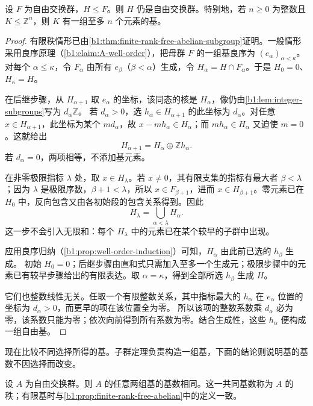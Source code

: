 \begin{theorem}[自由交换群的子群]\label{b1:thm:free-abelian-subgroup}
	设 \(F\) 为自由交换群，\(H\leq F\)。则 \(H\) 仍是自由交换群。特别地，若 \(n\geq0\) 为整数且 \(K\leq\mathbb Z^n\)，则 \(K\) 有一组至多 \(n\) 个元素的基。
\end{theorem}

\begin{proof}
	有限秩情形已由\cref{b1:thm:finite-rank-free-abelian-subgroup}证明。一般情形采用良序原理（\cref{b1:claim:A-well-order}），把母群 \(F\) 的一组基良序为 \((e_\alpha)_{\alpha<\kappa}\)。 对每个 \(\alpha\le\kappa\)，令 \(F_\alpha\) 由所有 \(e_\beta\)（\(\beta<\alpha\)）生成，令 \(H_\alpha=H\cap F_\alpha\)。于是 \(H_0=0\)、\(H_\kappa=H\)。

	在后继步骤，从 \(H_{\alpha+1}\) 取 \(e_\alpha\) 的坐标，该同态的核是 \(H_\alpha\)，像仍由\cref{b1:lem:integer-subgroups}写为 \(d_\alpha\mathbb Z\)。 若 \(d_\alpha>0\)，选 \(h_\alpha\in H_{\alpha+1}\) 的此坐标为 \(d_\alpha\)。对任意 \(x\in H_{\alpha+1}\)，此坐标为某个 \(md_\alpha\)，故 \(x-mh_\alpha\in H_\alpha\)；而 \(mh_\alpha\in H_\alpha\) 又迫使 \(m=0\)。这就给出
	\[
		H_{\alpha+1}=H_\alpha\oplus\mathbb Zh_\alpha.
	\]
	若 \(d_\alpha=0\)，两项相等，不添加基元素。

	在非零极限指标 \(\lambda\) 处，取 \(x\in H_\lambda\)。若 \(x\ne0\)，其有限支集的指标有最大者 \(\beta<\lambda\)；因为 \(\lambda\) 是极限序数，\(\beta+1<\lambda\)，所以 \(x\in F_{\beta+1}\)，进而 \(x\in H_{\beta+1}\)。零元素已在 \(H_0\) 中，反向包含又由各初始段的包含关系得到。因此
	\[
		H_\lambda=\bigcup_{\alpha<\lambda}H_\alpha.
	\]
	这一步不会引入无限和：每个 \(H_\lambda\) 中的元素已在某个较早的子群中出现。

	应用良序归纳（\cref{b1:prop:well-order-induction}）可知，\(H_\alpha\) 由此前已选的 \(h_\beta\) 生成。 初始 \(H_0=0\)；后继步骤由直和式只需加入至多一个生成元；极限步骤中的元素已有较早步骤给出的有限表达。取 \(\alpha=\kappa\)，得到全部所选 \(h_\beta\) 生成 \(H\)。

	它们也整数线性无关。任取一个有限整数关系，其中指标最大的 \(h_\alpha\) 在 \(e_\alpha\) 位置的坐标为 \(d_\alpha>0\)，而更早的项在该位置全为零。 所以该项的整数系数乘 \(d_\alpha\) 必为零，该系数只能为零；依次向前得到所有系数为零。结合生成性，这些 \(h_\alpha\) 便构成一组自由基。
\end{proof}

现在比较不同选择所得的基。子群定理负责构造一组基，下面的结论则说明基的基数不因选择而改变。

\begin{proposition}[秩不变性]\label{b1:prop:free-abelian-rank}
	设 \(A\) 为自由交换群。则 \(A\) 的任意两组基的基数相同。这一共同基数称为 \(A\) 的秩；有限基时与\cref{b1:prop:finite-rank-free-abelian}中的定义一致。
\end{proposition}

